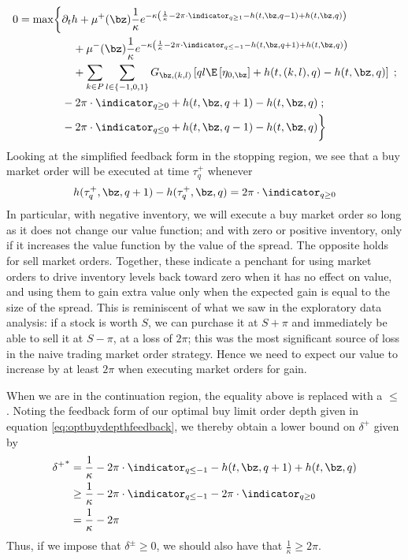 \documentclass[12pt]{article}
\begin{document}
\begin{equation}\label{eq:PDEcase1}
\begin{split}
0 = \max \biggl\lbrace & \partial_t h + \mu^+(\bz) \frac{1}{\kappa} e^{ -\kappa \left( \frac{1}{\kappa} - 2 \pi \cdot \indicator_{q \geq 1} - h(t,\bz,q-1) + h(t,\bz,q)  \right)} \\
& \quad + \mu^-(\bz) \frac{1}{\kappa} e^{ -\kappa \left( \frac{1}{\kappa} - 2 \pi \cdot \indicator_{q \leq -1} - h(t,\bz,q+1) + h(t,\bz,q) \right)} \\
& \quad + \sum_{k\in P} \sum_{l \in \{-1,0,1\}} G_{\bz,(k,l)} \left[ ql \E \left[ \eta_{0,\bz} \right] + h(t,(k,l),q) - h(t,\bz,q) \right] \; ; \\
& -2 \pi \cdot \indicator_{q \geq 0} + h(t, \bz, q+1) - h(t,\bz,q)   \; ; \\
& -2 \pi \cdot \indicator_{q \leq 0} + h(t, \bz, q-1) - h(t,\bz,q)  \biggr\rbrace
\end{split}
\end{equation}
Looking at the simplified feedback form in the stopping region, we see that a buy market order will be executed at time $\tau^+_q$ whenever
\begin{equation}
\label{eq:buyMOfeedback}
h(\tau^+_q, \bz, q+1) - h(\tau^+_q,\bz,q) = 2 \pi \cdot \indicator_{q \geq 0}
\end{equation}
In particular, with negative inventory, we will execute a buy market order so long as it does not change our value function; and with zero or positive inventory, only if it increases the value function by the value of the spread. The opposite holds for sell market orders. Together, these indicate a penchant for using market orders to drive inventory levels back toward zero when it has no effect on value, and using them to gain extra value only when the expected gain is equal to the size of the spread. This is reminiscent of what we saw in the exploratory data analysis: if a stock is worth $S$, we can purchase it at $S+\pi$ and immediately be able to sell it at $S-\pi$, at a loss of $2 \pi$; this was the most significant source of loss in the naive trading market order strategy. Hence we need to expect our value to increase by at least $2\pi$ when executing market orders for gain.

When we are in the continuation region, the equality above is replaced with a $\leq$. Noting the feedback form of our optimal buy limit order depth given in equation \ref{eq:optbuydepthfeedback}, we thereby obtain a lower bound on $\delta^+$ given by
\begin{align*}
{\delta^+}^* & = \frac{1}{\kappa} - 2 \pi \cdot \indicator_{q \leq -1} - h(t,\bz,q+1) + h(t,\bz,q) \\
& \geq \frac{1}{\kappa} - 2 \pi \cdot \indicator_{q \leq -1} - 2 \pi \cdot \indicator_{q \geq 0} \\
& = \frac{1}{\kappa} - 2 \pi
\end{align*}
Thus, if we impose that $\delta^\pm \geq 0$, we should also have that $\frac{1}{\kappa} \geq 2 \pi$.
\end{document}
